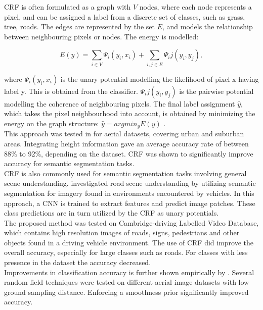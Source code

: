 \ac{CRF} is often formulated as a graph with $V$ nodes, where each node represents a pixel, and can be assigned a label from a discrete set of classes, such as grass, tree, roads. The edges are represented by the set $E$, and models the relationship between neighbouring pixels or nodes. The energy is modelled:

$$E(y) = \sum\limits_{i\in V} \Psi_i(y_i, x_i) + \sum\limits_{i,j\in E}\Psi_ij(y_i, y_j),$$

where $\Psi_i(y_i, x_i)$ is the unary potential modelling the likelihood of pixel x having label y. This is obtained from the classifier.  $\Psi_ij(y_i, y_j)$ is the pairwise potential modelling the coherence of neighbouring pixels. The final label assignment $\hat{y}$, which takes the pixel neighbourhood into account, is obtained by minimizing the energy on the graph structure:  $\hat{y} =argmin_y E(y)$ .\\

This approach was tested in \citep{Kluckner_semantic_height} for aerial datasets, covering urban and suburban areas. Integrating height information gave an average accuracy rate of between 88\% to 92\%, depending on the dataset. \ac{CRF} was shown to significantly improve accuracy for semantic segmentation tasks. \\ 

\ac{CRF} is also commonly used for semantic segmentation tasks involving general scene understanding. \cite{LeCun_semantic} investigated road scene understanding by utilizing semantic segmentation for imagery found in environments encountered by vehicles. In this approach, a \ac{CNN} is trained to extract features and predict image patches. These class predictions are in turn utilized by the \ac{CRF} as unary potentials.\\

The proposed method was tested on Cambridge-driving Labelled Video Database, which contains high resolution images of roads, signs, pedestrians and other objects found in a driving vehicle environment. The use of \ac{CRF} did improve the overall accuracy, especially for large classes such as roads. For classes with less presence in the dataset the accuracy decreased.\\

Improvements in classification accuracy is further shown empirically by \cite{Schindler_random_field_overview}. Several random field techniques were tested on different aerial image datasets with low ground sampling distance. Enforcing a smoothness prior significantly improved accuracy. \\

